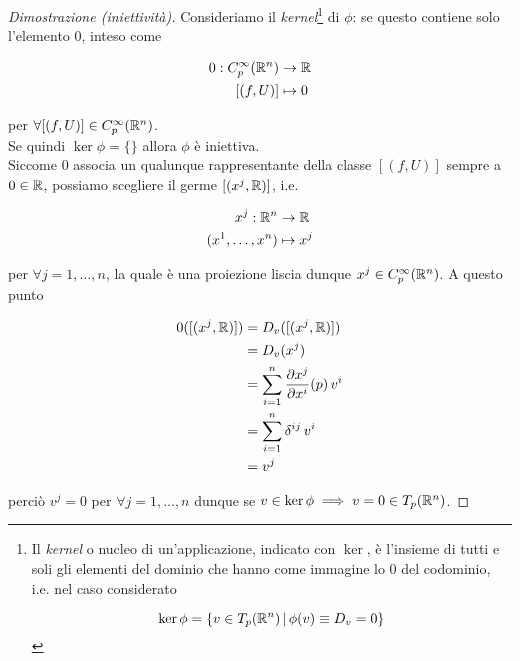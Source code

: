 \begin{proof}[Dimostrazione (iniettività)]
	Consideriamo il \textit{kernel}\footnote{%
	Il \textit{kernel} o nucleo di un'applicazione, indicato con $ \ker $, è l'insieme di tutti e soli gli elementi del dominio che hanno come immagine lo $ 0 $ del codominio, i.e. nel caso considerato
	
	\begin{equation}
		\ker \phi = \left\{ v \in T_{p}(\mathbb{R}^{n}) \, \middle| \, \phi(v) \equiv D_{v} = 0 \right\}
	\end{equation}%
	} di $ \phi $: se questo contiene solo l'elemento $ 0 $, inteso come
	
	\begin{align}
		\begin{split}
			0 : C_{p}^{\infty}(\mathbb{R}^{n}) &\to \mathbb{R}\\
			[(f,U)] &\mapsto 0
		\end{split}
	\end{align}

	per $ \forall [(f,U)] \in C_{p}^{\infty}(\mathbb{R}^{n}) $.\\
	Se quindi $ \ker \phi = \{\} $ allora $ \phi $ è iniettiva.\\
	Siccome $ 0 $ associa un qualunque rappresentante della classe $ [(f,U)] $ sempre a $ 0 \in \mathbb{R} $, possiamo scegliere il germe $ [(x^{j},\mathbb{R})] $, i.e.
	
	\begin{align}
		\begin{split}
			x^{j} : \mathbb{R}^{n} &\to \mathbb{R}\\
			(x^{1},\dots,x^{n}) &\mapsto x^{j}
		\end{split}
	\end{align}

	per $ \forall j=1,\dots,n $, la quale è una proiezione liscia dunque $ x^{j} \in C_{p}^{\infty}(\mathbb{R}^{n}) $. A questo punto
	
	\begin{align}
		\begin{split}
			0([(x^{j},\mathbb{R})]) &= D_{v} ([(x^{j},\mathbb{R})])\\
			&= D_{v} (x^{j})\\
			&= \sum_{i=1}^{n} \dfrac{\partial x^{j}}{\partial x^{i}} (p) \, v^{i}\\
			&= \sum_{i=1}^{n} \delta^{ij} \, v^{i}\\
			&= v^{j}
		\end{split}
	\end{align}

	perciò $ v^{j} = 0 $ per $ \forall j=1,\dots,n $ dunque se $ v \in \ker \phi \implies v = 0 \in T_{p}(\mathbb{R}^{n}) $.
\end{proof}

